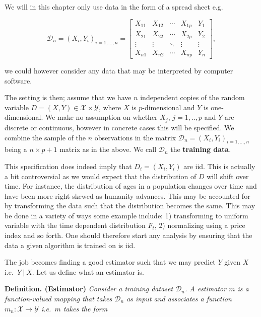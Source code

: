 \documentclass[
]{book}
\begin{document}
We will in this chapter only use data in the form of a spread sheet e.g.

\[
\mathcal{D}_n=
\left(X_i, Y_i \right)_{i=1,...,n}=
\left[
\begin{array}{cccc|c}
X_{11} & X_{12} & \cdots & X_{1p} & Y_1\\
X_{21} & X_{22} & \cdots & X_{2p} & Y_2\\
\vdots & \vdots & \ddots & \vdots & \vdots\\
X_{n1} & X_{n2} & \cdots & X_{np} & Y_n
\end{array}
\right],
\]

we could however consider any data that may be interpreted by computer software.

The setting is then; assume that we have \(n\) independent copies of the random variable \(D=(X,Y)\in \mathcal{X}\times \mathcal{Y}\), where \(X\) is \(p\)-dimensional and \(Y\) is one-dimensional. We make no assumption on whether \(X_j\), \(j=1,..,p\) and \(Y\) are discrete or continuous, however in concrete cases this will be specified. We combine the sample of the \(n\) observations in the matrix \(\mathcal{D}_n=(X_i,Y_i)_{i=1,...,n}\) being a \(n\times p+1\) matrix as in the above. We call \(\mathcal{D}_n\) the \textbf{training data}.

This specification does indeed imply that \(D_i=(X_i,Y_i)\) are iid. This is actually a bit controversial as we would expect that the distribution of \(D\) will shift over time. For instance, the distribution of ages in a population changes over time and have been more right skewed as humanity advances. This may be accounted for by transforming the data such that the distribution becomes the same. This may be done in a variety of ways some example include: 1) transforming to uniform variable with the time dependent distribution \(F_t\), 2) normalizing using a price index and so forth. One should therefore start any analysis by ensuring that the data a given algorithm is trained on is iid.

The job becomes finding a good estimator such that we may predict \(Y\) given \(X\) i.e.~\(Y\ \vert\ X\). Let us define what an estimator is.

\textbf{Definition. (Estimator)} \emph{Consider a training dataset \(\mathcal{D}_n\). A estimator \(m\) is a function-valued mapping that takes \(\mathcal{D}_n\) as input and associates a function \(m_n : \mathcal{X}\to \mathcal{Y}\) i.e.~\(m\) takes the form}
\end{document}
